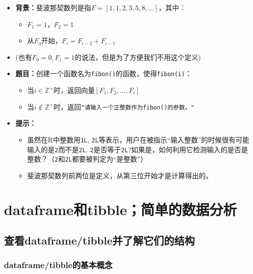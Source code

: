 \documentclass[]{book}
\providecommand{\tightlist}{%
  \setlength{\itemsep}{0pt}\setlength{\parskip}{0pt}}
\begin{document}
\begin{itemize}
\tightlist
\item
  \textbf{背景：}斐波那契数列是指\(F = [1, 1, 2, 3, 5, 8, ...]\)，其中：

  \begin{itemize}
  \tightlist
  \item
    \(F_1 = 1\)，\(F_2 = 1\)
  \item
    从\(F_3\)开始，\(F_i = F_{i-2} + F_{i-1}\)
  \end{itemize}
\item
  (也有\(F_0=0, F_1=1\)的说法，但是为了方便我们不用这个定义)
\item
  \textbf{题目：}创建一个函数名为\texttt{fibon()}的函数，使得\texttt{fibon(i)}：

  \begin{itemize}
  \tightlist
  \item
    当\(i\in \mathbb{Z}^+\)时，返回向量\([F_1, F_2, \ldots, F_i]\)
  \item
    当\(i\notin \mathbb{Z}^+\)时，返回\texttt{"请输入一个正整数作为\textasciigrave{}fibon()\textasciigrave{}的参数。"}
  \end{itemize}
\item
  \textbf{提示：}

  \begin{itemize}
  \tightlist
  \item
    虽然在R中整数用\texttt{1L}, \texttt{2L}等表示，用户在被指示``输入整数''的时候很有可能输入的是\texttt{2}而不是\texttt{2L}. \texttt{2}是否等于\texttt{2L}?如果是，如何利用它检测输入的是否是整数？（\texttt{2}和\texttt{2L}都要被判定为``是整数''）
  \item
    斐波那契数列前两位是定义，从第三位开始才是计算得出的。
  \end{itemize}
\end{itemize}

\hypertarget{tibble}{%
\chapter{dataframe和tibble；简单的数据分析}\label{tibble}}

\hypertarget{tibble-view}{%
\section{查看dataframe/tibble并了解它们的结构}\label{tibble-view}}

\hypertarget{tibble-concept}{%
\subsection{dataframe/tibble的基本概念}\label{tibble-concept}}
\end{document}
